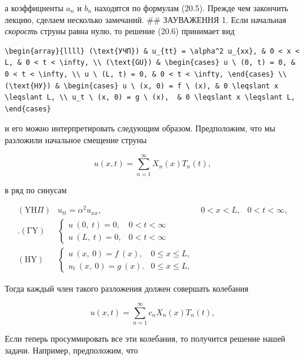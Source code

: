 \documentclass[
  ukrainian,
]{article}
\begin{document}
а коэффициенты \(a_n\) и \(b_n\) находятся по формулам (20.5). Прежде
чем закончить лекцию, сделаем несколько замечаний. \#\# ЗАУВАЖЕННЯ 1.
Если начальная \emph{скорость} струны равна нулю, то решение (20.6)
принимает вид

\begin{verbatim}
\begin{array}{llll} (\text{УЧП}) & u_{tt} = \alpha^2 u_{xx}, & 0 < x < L, & 0 < t < \infty, \\ (\text{GU}) & \begin{cases} u \ (0, t) = 0, & 0 < t < \infty, \\ u \ (L, t) = 0, & 0 < t < \infty, \end{cases} \\ (\text{НУ}) & \begin{cases} u \ (x, 0) = f \ (x), & 0 \leqslant x \leqslant L, \\ u_t \ (x, 0) = g \ (x),  & 0 \leqslant x \leqslant L, \end{cases}
\end{verbatim}

и его можно интерпретировать следующим образом. Предположим, что мы
разложили начальное смещение струны

\[
u(x, t) = \sum_{n=1}^{\infty} X_n(x) T_n(t),
\]

в ряд по синусам

\[
\begin{array}{llll} (\mathrm{Y}\mathrm{H}\Pi) & u_{tt} = \alpha^2 u_{xx}, & 0 < x < L, & 0 < t < \infty, \\ . (\mathrm{\Gamma}\mathrm{Y}) & \begin{cases} u \ (0, \ t) = 0, & 0 < t < \infty \\ u \ (L, \ t) = 0, & 0 < t < \infty \end{cases} \\ (\mathrm{H}\mathrm{Y}) & \begin{cases} u \ (x, \ 0) = f \ (x), & 0 \leqslant x \leqslant L, \\ u_t \ (x, \ 0) = g \ (x). & 0 \leqslant x \leqslant L, \end{cases} \end{array}
\]

Тогда каждый член такого разложения должен совершать колебания

\[
u(x, t) = \sum_{n=1}^{\infty} c_n X_n(x) T_n(t),
\]

Если теперь просуммировать все эти колебания, то получится решение нашей
задачи. Например, предположим, что
\end{document}
